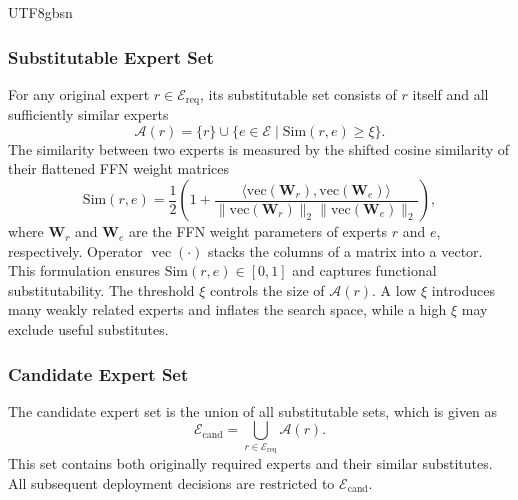 \documentclass[journal]{IEEEtran}
\begin{document}
\begin{CJK*}{UTF8}{gbsn}
\subsubsection{Substitutable Expert Set}
For any original expert \(r \in \mathcal{E}_{\mathrm{req}}\), its substitutable set consists of \(r\) itself and all sufficiently similar experts
\begin{equation}
\mathcal{A}(r) = \{ r \} \cup \{ e \in \mathcal{E} \mid \mathrm{Sim}(r,e) \ge \xi \}.
\label{eq:ar}
\end{equation}
The similarity between two experts is measured by the shifted cosine similarity of their flattened FFN weight matrices
\begin{equation}
\mathrm{Sim}(r,e) = \frac{1}{2} \left( 1 + \frac{\langle \mathrm{vec}(\mathbf{W}_r), \mathrm{vec}(\mathbf{W}_e) \rangle}{\|\mathrm{vec}(\mathbf{W}_r)\|_2 \|\mathrm{vec}(\mathbf{W}_e)\|_2} \right),
\label{eq:sim}
\end{equation}
where \(\mathbf{W}_r\) and \(\mathbf{W}_e\) are the FFN weight parameters of experts \(r\) and \(e\), respectively. Operator $\operatorname{vec}(\cdot)$ stacks the columns of a matrix into a vector. This formulation ensures \(\mathrm{Sim}(r,e) \in [0,1]\) and captures functional substitutability. The threshold \(\xi\) controls the size of \(\mathcal{A}(r)\). A low \(\xi\) introduces many weakly related experts and inflates the search space, while a high \(\xi\) may exclude useful substitutes.

\subsubsection{Candidate Expert Set}
The candidate expert set is the union of all substitutable sets, which is given as
\begin{equation}
\mathcal{E}_{\mathrm{cand}} = \bigcup_{r \in \mathcal{E}_{\mathrm{req}}} \mathcal{A}(r).
\label{eq:ecand}
\end{equation}
This set contains both originally required experts and their similar substitutes. All subsequent deployment decisions are restricted to \(\mathcal{E}_{\mathrm{cand}}\).


\end{CJK*}
\end{document}
